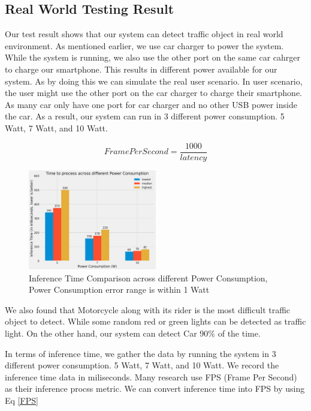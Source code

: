 \documentclass[conference]{IEEEtran}
\begin{document}
\subsection{Real World Testing Result}
Our test result shows that our system can detect traffic object in real world environment.
As mentioned earlier, we use car charger to power the system. While the system is running, we also use the other port on the same car cahrger to charge our smartphone. This results in different power available for our system.
As by doing this we can simulate the real user scenario. In user scenario, the user might use the other port on the car charger to charge their smartphone. As many car only have one port for car charger and no other USB power inside the car.
As a result, our system can run in 3 different power consumption. 5 Watt, 7 Watt, and 10 Watt.

\begin{equation}\label{FPS}
    Frame Per Second = \frac{1000}{latency}
\end{equation}

\begin{figure}[h!]
\centering
\includegraphics[width=0.5\textwidth,keepaspectratio]{inference_time_comparison.png}
\caption{Inference Time Comparison across different Power Consumption, Power Consumption error range is within 1 Watt}
\label{fig:inference_time_comparison}
\end{figure}
We also found that Motorcycle along with its rider is the most difficult traffic object to detect. While some random red or green lights can be detected as traffic light.
On the other hand, our system can detect Car 90\% of the time.

In terms of inference time, we gather the data by running the system in 3 different power consumption. 5 Watt, 7 Watt, and 10 Watt. We record the inference time data in miliseconds.
Many research use FPS (Frame Per Second) as their inference procss metric. We can convert inference time into FPS by using Eq \eqref{FPS}
\end{document}
